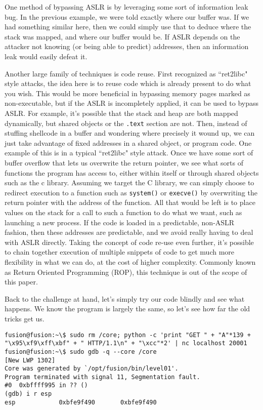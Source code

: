 One method of bypassing ASLR is by leveraging some sort of
information leak bug. In the previous example, we were told
exactly where our buffer was. If we had something similar here, 
then we could simply use that to deduce where the stack was
mapped, and where our buffer would be. If ASLR depends on the 
attacker not knowing (or being able to predict) addresses, 
then an information leak would easily defeat it.

Another large family of techniques is code reuse. First recognized
as ``ret2libc" style attacks, the idea here is to reuse code
which is already present to do what you wish. This would be 
more beneficial in bypassing memory pages marked as non-executable,
but if the ASLR is incompletely applied, it can be used to bypass
ASLR. For example, it's possible that the stack and heap are both
mapped dynamically, but shared objects or the \texttt{.text} section are not.
Then, instead of stuffing shellcode in a buffer and wondering where
precisely it wound up, we can just take advantage of fixed
addresses in a shared object, or program code. One example of this
is in a typical ``ret2libc" style attack. Once we have some
sort of buffer overflow that lets us overwrite the return pointer,
we see what sorts of functions the program has access to, either
within itself or through shared objects such as the c library.
Assuming we target the C library, we can simply choose to redirect
execution to a function such as \texttt{system()} or \texttt{execve()}
by overwriting the return pointer with the address of the function.
All that would be left is to place values on the stack 
for a call to such a function to do what we want, such as
launching a new process. If the code is loaded in a predictable, 
non-ASLR fashion, then these addresses are predictable, and
we avoid really having to deal with ASLR directly. Taking the concept
of code re-use even further, it's possible to chain together
execution of multiple snippets of code to get much more flexibility
in what we can do, at the cost of higher complexity. Commonly known
as Return Oriented Programming (ROP), this technique is out of the 
scope of this paper.

Back to the challenge at hand, let's simply try our code blindly
and see what happens. We know the program is largely the same, 
so let's see how far the old tricks get us.

\begin{lstlisting}
fusion@fusion:~\$ sudo rm /core; python -c 'print "GET " + "A"*139 + "\x95\xf9\xff\xbf" + " HTTP/1.1\n" + "\xcc"*2' | nc localhost 20001
fusion@fusion:~\$ sudo gdb -q --core /core
[New LWP 1302]
Core was generated by `/opt/fusion/bin/level01'.
Program terminated with signal 11, Segmentation fault.
#0  0xbffff995 in ?? ()
(gdb) i r esp
esp            0xbfe9f490       0xbfe9f490
\end{lstlisting}

